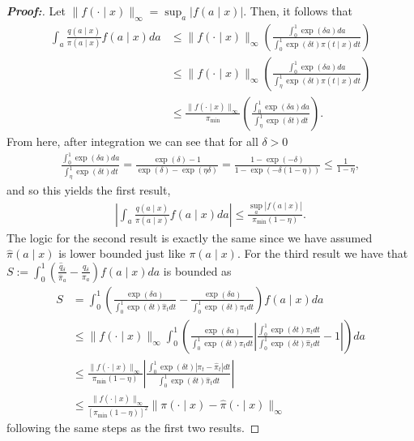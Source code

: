 \documentclass[11pt,twoside]{article}
\theoremstyle{definition}
\theoremstyle{remark}
\begin{document}
\begin{proof}[\textbf{Proof:}]
Let $\| f(\cdot \mid x) \|_\infty = \sup_a | f(a \mid x)|$. Then, it follows that
\begin{align*}
    \int_a \frac{q(a \mid x)}{\pi(a \mid x)} f(a \mid x) da &\leq  \| f(\cdot \mid x) \|_\infty \left(\frac{\int^1_0\exp(\delta a)  da }{\int^1_0 \exp(\delta t) \pi(t \mid x)  dt} \right) \\
    &\leq  \| f(\cdot \mid x) \|_\infty \left(\frac{\int^1_0\exp(\delta a)  da }{\int^1_\eta \exp(\delta t) \pi(t \mid x)  dt} \right) \\
    &\leq  \frac{\| f(\cdot \mid x) \|_\infty}{\pi_{\min}} \left(\frac{\int^1_0\exp(\delta a)  da }{\int^1_\eta \exp(\delta t) dt} \right).
\end{align*}
From here, after integration we can see that for all $\delta > 0$
\begin{align*}
    \frac{\int^1_0\exp(\delta a)  da }{\int^1_\eta \exp(\delta t) dt} = \frac{\exp(\delta) - 1}{\exp(\delta) - \exp(\eta \delta)} = \frac{1 - \exp(-\delta)}{1 - \exp(-\delta(1 - \eta))} \leq \frac{1}{1 - \eta},
\end{align*}
and so this yields the first result,
\begin{align*}
    \left| \int_a \frac{q(a \mid x)}{\pi(a \mid x)} f(a \mid x) da \right| \leq \frac{ \sup_a | f(a \mid x) |}{\pi_{\min}(1 - \eta)}.
\end{align*}
The logic for the second result is exactly the same since we have assumed $\widehat{\pi}(a \mid x)$ is lower bounded just like $\pi(a \mid x)$. For the third result we have that $S := \int^{1}_{0} \left(  \frac{\widehat{q}_\delta}{\widehat\pi_a} - \frac{q_\delta}{\pi_a} \right) f(a \mid x)  da$ is bounded as
\begin{align*}
    S &= \int^{1}_{0} \left( \frac{\exp(\delta a)}{\int^{1}_{0} \exp(\delta t) \widehat{\pi}_t dt} - \frac{\exp(\delta a)}{\int^{1}_{0} \exp(\delta t) \pi_t  dt}  \right) f(a \mid x)  da \\
    &\leq \| f(\cdot \mid x) \|_\infty \int^1_0 \left( \frac{\exp(\delta a)}{\int^1_0 \exp(\delta t) \pi_t  dt} \left|  \frac{\int^1_0 \exp(\delta t) \pi_t dt}{\int^1_0\exp(\delta t) \widehat{\pi}_t  dt}  - 1 \right| \right) da \\
    &\leq \frac{\| f(\cdot \mid x) \|_\infty}{\pi_{\min}(1 - \eta)}  \left|  \frac{\int^1_0 \exp(\delta t) |\pi_t - \widehat{\pi}_t|  dt}{\int^1_0 \exp(\delta t) \widehat{\pi}_t  dt} \right|  \\
    &\leq \frac{\| f(\cdot \mid x) \|_\infty}{[\pi_{\min}(1-\eta)]^2}  \| \pi(\cdot \mid x) - \widehat\pi(\cdot \mid x) \|_\infty
\end{align*}
following the same steps as the first two results.
\end{proof}
\end{document}
